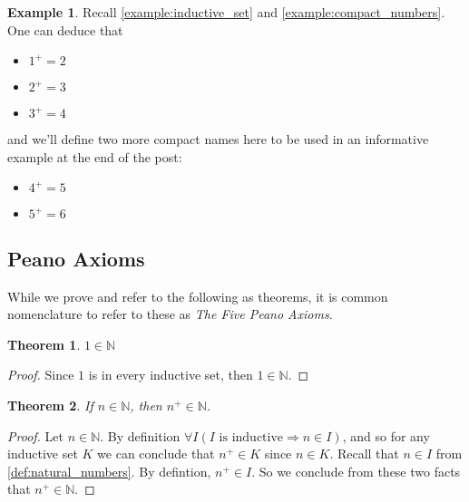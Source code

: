 \documentclass{article}
\theoremstyle{definition}
\theoremstyle{definition}
\newtheorem{example}{Example}[section]
\theoremstyle{plain}
\theoremstyle{remark}
\theoremstyle{plain}
\newtheorem{theorem}{Theorem}[section]
\theoremstyle{remark}
\theoremstyle{plain}
\theoremstyle{plain}
\theoremstyle{plain}
\theoremstyle{plain}
\begin{document}
\begin{example}
  Recall \autoref{example:inductive_set} and \autoref{example:compact_numbers}. 
  One can deduce that 
  \begin{itemize}
    \item \(1^{+} = 2 \)
    \item \(2^{+} = 3\)
    \item \(3^{+} = 4\)
  \end{itemize}
  and we'll define two more compact names here to be used in an informative 
  example at the end of the post: 
  \begin{itemize}
    \item \(4^{+} = 5\)
    \item \(5^{+} = 6\)
  \end{itemize}
  \label{example:successor}
\end{example}

\subsection{Peano Axioms}

While we prove and refer to the following as theorems, it is common nomenclature 
to refer to these as \textit{The Five Peano Axioms}.

\begin{theorem}
  \( 1 \in \mathbb{N} \)
  \label{thm:first_peano_axiom}
\end{theorem}

\begin{proof}
  Since \( 1 \) is in every inductive set, then \( 1 \in \mathbb{N} \).
\end{proof}

\begin{theorem}
  If \( n \in \mathbb{N} \), then \( n^{+} \in \mathbb{N} \).
  \label{thm:second_peano_axiom}
\end{theorem}

\begin{proof}
  Let \( n \in \mathbb{N} \). By definition 
  \( \forall I ( I \text{ is inductive} \Rightarrow n \in I ) \), and so
  for any inductive set \(K\) we can conclude that \( n^{+} \in K \) since
  \( n \in K \). 
  Recall that \( n \in I \) from \autoref{def:natural_numbers}. By defintion, 
  \( n^{+} \in I \). So we conclude from these two facts that 
  \( n^{+} \in \mathbb{N} \).
\end{proof}

\newpage
\end{document}
